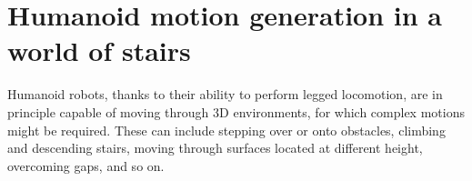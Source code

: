 \chapter{Humanoid motion generation in a world of stairs}

\makeatletter
{}
\makeatother



\makeatletter
\newcommand{\removelatexerror}{\let\@latex@error\@gobble}
\makeatother
\let\oldnl\nl%
\newcommand{\nonl}{\renewcommand{\nl}{\let\nl\oldnl}}%

\renewcommand\textfraction{0.0}
\renewcommand\bottomfraction{1.0}
\renewcommand\topfraction{1.0}
\renewcommand\dbltopfraction{1.0}
\setcounter{topnumber}{8}
\setcounter{dbltopnumber}{8}
\setcounter{bottomnumber}{8}
\setcounter{totalnumber}{8}
	
	

Humanoid robots, thanks to their ability to perform legged locomotion, are in principle capable of moving through 3D environments, for which complex motions might be required. These can include stepping over or onto obstacles, climbing and descending stairs, moving through surfaces located at different height, overcoming gaps, and so on.

